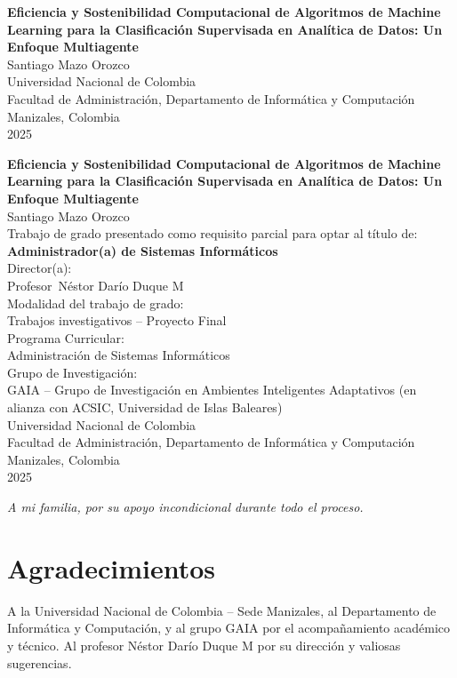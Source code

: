 \documentclass[12pt,oneside]{report}
\newcommand{\ThesisTitle}{Eficiencia y Sostenibilidad Computacional de Algoritmos de Machine Learning para la Clasificación Supervisada en Analítica de Datos: Un Enfoque Multiagente}
\newcommand{\ThesisAuthor}{Santiago Mazo Orozco}
\newcommand{\University}{Universidad Nacional de Colombia}
\newcommand{\Faculty}{Facultad de Administración, Departamento de Informática y Computación}
\newcommand{\City}{Manizales, Colombia}
\newcommand{\Year}{2025}
\newcommand{\DegreeTarget}{Administrador(a) de Sistemas Informáticos}
\newcommand{\AdvisorTitle}{Profesor}
\newcommand{\AdvisorName}{Néstor Darío Duque M}
\newcommand{\Modality}{Trabajos investigativos – Proyecto Final}
\newcommand{\Program}{Administración de Sistemas Informáticos}
\newcommand{\ResearchGroup}{GAIA – Grupo de Investigación en Ambientes Inteligentes Adaptativos (en alianza con ACSIC, Universidad de Islas Baleares)}
\begin{document}
\thispagestyle{empty}
\begin{center}
\Large\textbf{\ThesisTitle}\\[2cm]
\large\ThesisAuthor\\[1.5cm]
\University \\ \Faculty \\ \City \\ \Year
\end{center}
\clearpage

\thispagestyle{empty}
\begin{center}
\Large\textbf{\ThesisTitle}\\[2cm]
\large\ThesisAuthor\\[1.5cm]
\normalsize Trabajo de grado presentado como requisito parcial para optar al título de: \\[0.2cm]
\textbf{\DegreeTarget}\\[0.8cm]
Director(a): \\ \AdvisorTitle~\AdvisorName\\[0.4cm]
Modalidad del trabajo de grado: \\ \Modality\\[0.4cm]
Programa Curricular: \\ \Program\\[0.4cm]
Grupo de Investigación: \\ \ResearchGroup\\[1.2cm]
\University \\ \Faculty \\ \City \\ \Year
\end{center}
\clearpage

\thispagestyle{empty}
\begin{flushright}
\emph{A mi familia, por su apoyo incondicional durante todo el proceso.}
\end{flushright}
\clearpage

\chapter*{Agradecimientos}
A la Universidad Nacional de Colombia – Sede Manizales, al Departamento de Informática y Computación, y al grupo GAIA por el acompañamiento académico y técnico. Al profesor \AdvisorName{} por su dirección y valiosas sugerencias.
\clearpage

\setcounter{page}{7} %
\end{document}
